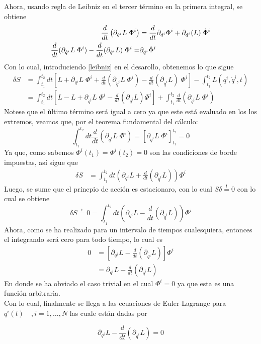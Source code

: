 \documentclass[../main_ej.tex]{subfiles}
\begin{document}
Ahora, usando regla de Leibniz en el tercer término en la primera integral, se obtiene
\begin{align} 
  \frac{d}{dt}\left( \partial_{\dot{q}^i} L\; \Phi^i \right) & = \frac{d}{dt}\partial_{\dot{q}^i}\Phi^i + \partial_{\dot{q}^i}(L) \; \dot{\Phi}^i \label{leibniz} \\
  \frac{d}{dt}(\partial_{\dot{q}^i}L\;\Phi^i)  -\frac{d}{dt}( \partial_{\dot{q}^i}L)\; \Phi^i = & \partial_{\dot{q}^i}\dot{\Phi}^i \notag
\end{align}
Con lo cual, introduciendo \eqref{leibniz} en el desarollo, obtenemos lo que sigue
\begin{align*}
  \delta S & = \int_{t_1}^{t_2} dt \left[  L + \partial_{q^i} L \; \Phi^i + \frac{d}{dt}(\partial_{\dot{q}^i}L \; \Phi^i)  -\frac{d}{dt} (\partial_{\dot{q}^i}L)\; \Phi^i\right] - \int_{t_1}^{t_2} L(q^i,\dot{q}^i,t)  \\
  & = \int_{t_1}^{t_2} dt \left[ L - L+ \partial_{\dot{q}^i} L \; \Phi^i - \frac{d}{dt}(\partial_{\dot{q}^i} L)\Phi^i\right]  + \int_{t_1}^{t_2}\frac{d}{dt}(\partial_{\dot{q}^i}L\; \Phi^i)
\end{align*}
Notese que el ùltimo término será igual a cero ya que este está evaluado en los los extremos, veamos que, por el teorema fundamental del cálculo:
\begin{equation*}
  \int_{t_1}^{t_2}dt \frac{d}{dt} (\partial_{\dot{q}^i}L \; \Phi^i) =  \left[\partial_{\dot{q}^i}L \; \Phi^i\right]_{t_1}^{t_2} = 0
\end{equation*}
Ya que, como sabemos $\Phi^i(t_1)=\Phi^i(t_2)=0$ son las condiciones de borde impuestas, así sigue que
\begin{align*}
  \delta S & = \int_{t_1}^{t_2} dt \left( \partial_{q^i}L + \frac{d}{dt}(\partial_{\dot{q}^i}L) \right)\Phi^i 
\end{align*}
Luego, se sume que el princpio de acción es estacionaro, con lo cual $S\delta \stackrel{!}{=}0$ con lo cual se obtiene
\begin{equation*}
  \delta S \stackrel{!}{=}0=\int_{t_1}^{t_2} dt \left( \partial_{q^i}L - \frac{d}{dt} (\partial_{\dot{q}^i}L) \right) \Phi^i
\end{equation*}
Ahora, como se ha realizado para un intervalo de tiempos cualesquiera, entonces el integrando será cero para todo tiempo, lo cual es
\begin{align*}
  0 & =\left[\partial_{q^i}L-\frac{d}{dt}(\partial_{\dot{q^i}}L)\right] \Phi^i \\
  & = \partial_{q^i}L- \frac{d}{dt}(\partial_{\dot{q}^i}L)
\end{align*}
En donde se ha obviado el caso trivial en el cual $\Phi^i=0$ ya que esta es una función arbitraria. \\ 
Con lo cual, finalmente se llega a las ecuaciones de Euler-Lagrange para $q^i(t) \quad , i=1,\dots,N$ las cuale están dadas por

\begin{equation}
  \boxed{\partial_{q^i}L-\frac{d}{dt}(\partial_{\dot{q}^i}L)=0}
\end{equation}
\end{document}
